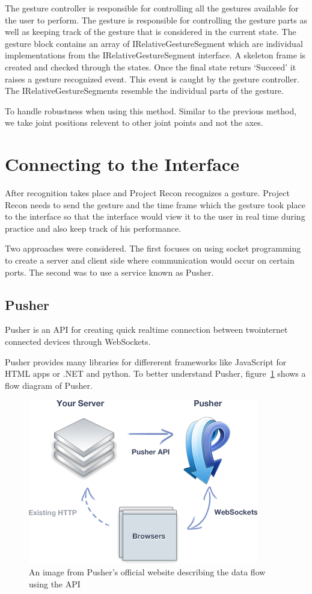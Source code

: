 The gesture controller is responsible for controlling all the gestures available for the user to perform. The gesture is responsible for controlling the gesture parts as well as keeping track of the gesture that is considered in the current state. The gesture block contains an array of IRelativeGestureSegment which are individual implementations from the IRelativeGestureSegment interface. A skeleton frame is created and checked through the states. Once the final state returs `Succeed' it raises a gesture recognized event. This event is caught by the gesture controller. The IRelativeGestureSegments resemble the individual parts of the gesture.

To handle robustness when using this method. Similar to the previous method, we take joint positions relevent to other joint points and not the axes.
\section{Connecting to the Interface}
After recognition takes place and Project Recon recognizes a gesture. Project Recon needs to send the gesture and the time frame which the gesture took place to the interface so that the interface would view it to the user in real time during practice and also keep track of his performance.

Two approaches were considered. The first focuses on using socket programming to create a server and client side where communication would occur on certain ports. The second was to use a service known as Pusher.
\subsection{Pusher \cite{citeKey4}}
Pusher is an API for creating quick realtime connection between twointernet connected devices through WebSockets.

Pusher provides many libraries for differerent frameworks like JavaScript for HTML apps or .NET and python. To better understand Pusher, figure~\ref{pusher} shows a flow diagram of Pusher.

\begin{figure}[!htbp]
\centering
\includegraphics{images/pusher.png}
\caption{An image from Pusher's official website describing the data flow using the API}
\label{pusher}
\end{figure}

